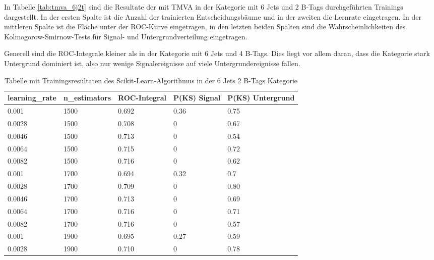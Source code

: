 In Tabelle \ref{tab:tmva_6j2t} sind die Resultate der mit TMVA in der Kategorie mit 6 Jets und 2 B-Tags  durchgef\"uhrten Trainings dargestellt. In der ersten Spalte ist die Anzahl der trainierten Entscheidungsb\"aume und in der zweiten die Lernrate eingetragen. In der mittleren Spalte ist die Fl\"ache unter der ROC-Kurve eingetragen, in den letzten beiden Spalten sind die Wahrscheinlichkeiten des Kolmogorow-Smirnow-Tests f\"ur Signal- und Untergrundverteilung eingetragen.

Generell sind die ROC-Integrale kleiner als in der Kategorie mit 6 Jets und 4 B-Tags. Dies liegt vor allem daran, dass die Kategorie stark Untergrund dominiert ist, also nur wenige Signalereignisse auf viele Untergrundereignisse fallen.

\begin{table}[tbp]\parbox{12cm}{
  \caption[Scikit-Learn 6j2t Ergebnisse]{Tabelle mit Trainingsresultaten des Scikit-Learn-Algorithmus in der 6 Jets 2 B-Tags Kategorie}%
  }\label{tab:sklearn_6j2t}
  \begin{center}
  \begin{tabular}{lllll}
  \hline
  learning\_rate & n\_estimators & ROC-Integral & P(KS) Signal & P(KS) Untergrund\\
  \hline
\num{0,001}  & \num{1500} & \num{0,692} & \num{0,36} & \num{0,75}\\
\num{0,0028} & \num{1500} & \num{0,708} & \num{0}    & \num{0,67}\\
\num{0,0046} & \num{1500} & \num{0,713} & \num{0}    & \num{0,54}\\
\num{0,0064} & \num{1500} & \num{0,715} & \num{0}    & \num{0,72}\\
\num{0,0082} & \num{1500} & \num{0,716} & \num{0}    & \num{0,62}\\
\num{0,001}  & \num{1700} & \num{0,694} & \num{0,32} & \num{0,7}\\
\num{0,0028} & \num{1700} & \num{0,709} & \num{0}    & \num{0,80}\\
\num{0,0046} & \num{1700} & \num{0,713} & \num{0}    & \num{0,69}\\
\num{0,0064} & \num{1700} & \num{0,716} & \num{0}    & \num{0,71}\\
\num{0,0082} & \num{1700} & \num{0,716} & \num{0}    & \num{0,57}\\
\num{0,001}  & \num{1900} & \num{0,695} & \num{0,27} & \num{0,59}\\
\num{0,0028} & \num{1900} & \num{0,710} & \num{0}    & \num{0,78}\\

\end{tabular}
\end{center}
\end{table}
